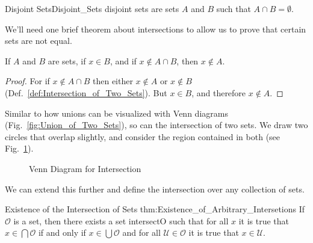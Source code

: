         \begin{fdefinition}{Disjoint Sets}{Disjoint_Sets}
            \Gls{disjoint sets} are \glspl{set} $A$ and $B$ such that
            $A\cap{B}=\emptyset$.
        \end{fdefinition}
        We'll need one brief theorem about intersections to allow us to prove
        that certain sets are not equal.
        \begin{theorem}
            \label{thm:Lemma_for_Anti_Russells_Paradox}%
            If $A$ and $B$ are sets, if $x\in{B}$, and if $x\notin{A}\cap{B}$,
            then $x\notin{A}$.
        \end{theorem}
        \begin{proof}
            For if $x\notin{A}\cap{B}$ then either $x\notin{A}$ or $x\notin{B}$
            (Def.~\ref{def:Intersection_of_Two_Sets}). But $x\in{B}$, and
            therefore $x\notin{A}$.
        \end{proof}
        Similar to how unions can be visualized with Venn diagrams
        (Fig.~\ref{fig:Union_of_Two_Sets}), so can the intersection of
        two sets. We draw two circles that overlap slightly, and consider the
        region contained in both (see Fig.~\ref{fig:Intersection_of_Two_Sets}).
        \begin{figure}[H]
            \centering
            \captionsetup{type=figure}
            
            \caption{Venn Diagram for Intersection}
            \label{fig:Intersection_of_Two_Sets}
        \end{figure}
        We can extend this further and define the intersection over any
        collection of sets.
        \begin{ltheorem}{Existence of the Intersection of Sets}
                        {thm:Existence_of_Arbitrary_Intersetions}
            If $\mathcal{O}$ is a set, then there exists a set \gls{intersectO}
            such that for all $x$ it is true that $x\in\bigcap\mathcal{O}$ if
            and only if $x\in\bigcup\mathcal{O}$ and for all
            $\mathcal{U}\in\mathcal{O}$ it is true that $x\in\mathcal{U}$.
        \end{ltheorem}
